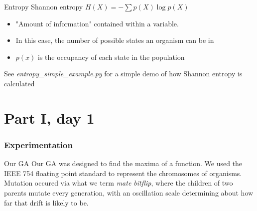 \documentclass[10pt,aspectratio=169]{beamer}
\begin{document}
\begin{frame}{Entropy}
		Shannon entropy $H(X) = -\sum p(X)\log p(X)$
		\\
		\medskip
		\begin{itemize}
			\item "Amount of information" contained within a variable.
			\item In this case, the number of possible states an organism can be in
			\item $p(x)$ is the occupancy of each state in the population
		\end{itemize}
		\bigskip
		See \emph{entropy\_simple\_example.py} for a simple demo of how Shannon entropy is calculated
\end{frame}

\part{Part I, day 1}

\section{Experimentation}


\begin{frame}{Our GA}
	Our GA was designed to find the maxima of a function. We used the IEEE 754 floating point standard to represent the chromosomes of organisms. Mutation occured via what we term \emph{mate bitflip}, where the children of two parents mutate every generation, with an oscillation scale determining about how far that drift is likely to be.
\end{frame}
\end{document}
